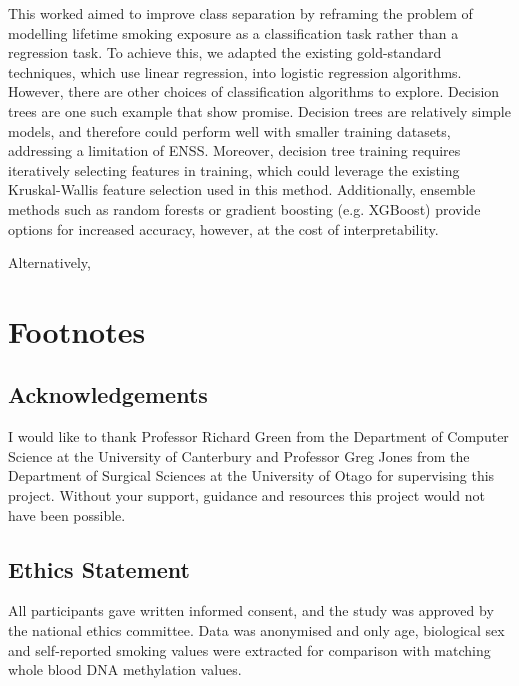 \documentclass{article} %
\begin{document}
This worked aimed to improve class separation by reframing the problem of modelling lifetime smoking exposure as a classification task rather than a regression task. To achieve this, we adapted the existing gold-standard techniques, which use linear regression, into logistic regression algorithms. However, there are other choices of classification algorithms to explore. Decision trees are one such example that show promise. Decision trees are relatively simple models, and therefore could perform well with smaller training datasets, addressing a limitation of ENSS. Moreover, decision tree training requires iteratively selecting features in training, which could leverage the existing Kruskal-Wallis feature selection used in this method. Additionally, ensemble methods such as random forests or gradient boosting (e.g. XGBoost) provide options for increased accuracy, however, at the cost of interpretability.

Alternatively, 

\section{Footnotes}
\subsection{Acknowledgements}
I would like to thank Professor Richard Green from the Department of Computer Science at the University of Canterbury and Professor Greg Jones from the Department of Surgical Sciences at the University of Otago for supervising this project. Without your support, guidance and resources this project would not have been possible. 


\subsection{Ethics Statement}
All participants gave written informed consent, and the study was approved by the national ethics committee. Data was anonymised and only age, biological sex and self-reported smoking values were extracted for comparison with matching whole blood DNA methylation values.

\printbibliography
\end{document}
